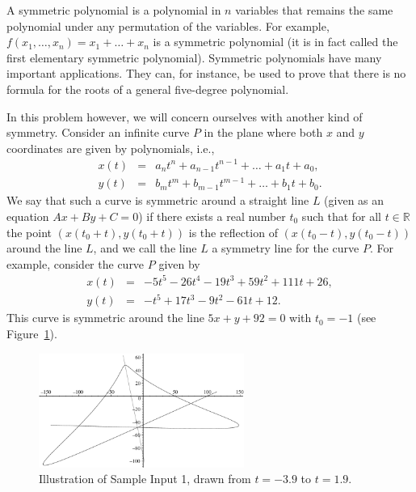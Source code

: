 
\noindent
A symmetric polynomial is a polynomial in $n$ variables that remains
the same polynomial under any permutation of the variables.  For
example, $f(x_1, \ldots, x_n) = x_1 + \ldots + x_n$ is a symmetric
polynomial (it is in fact called the first elementary symmetric
polynomial).  Symmetric polynomials have many important applications.
They can, for instance, be used to prove that there is no formula for
the roots of a general five-degree polynomial.

In this problem however, we will concern ourselves with another kind
of symmetry.  Consider an infinite curve $P$ in the plane where both
$x$ and $y$ coordinates are given by polynomials, i.e.,
\begin{eqnarray*}
  x(t) & = & a_nt^n + a_{n-1}t^{n-1} + \ldots + a_1t + a_0,\\
  y(t) & = & b_mt^m + b_{m-1}t^{m-1} + \ldots + b_1t + b_0.
\end{eqnarray*}
We say that such a curve is symmetric around a straight line $L$ (given
as an equation $Ax + By + C = 0$) if there exists a real number $t_0$ such
that for all $t \in \mathbb{R}$ the point $(x(t_0+t), y(t_0+t))$ is the reflection of $(x(t_0-t),
y(t_0-t))$ around the line $L$, and we call the line $L$ a symmetry
line for the curve $P$.  For example, consider the curve $P$ given by
\begin{eqnarray*}
  x(t) & = & -5t^5 - 26t^4 - 19t^3 + 59t^2 + 111t + 26, \\
  y(t) & = & -t^5 + 17t^3 - 9t^2 - 61t + 12.
\end{eqnarray*}
This curve is symmetric around the line $5x + y + 92 = 0$ with $t_0 = -1$ (see Figure~\ref{fig:sympoly sample}).

\begin{figure}[h]
    \centering
    \includegraphics[width=0.6\textwidth]{poly_example}
    \caption{Illustration of Sample Input 1, drawn from $t = -3.9$ to $t = 1.9$.}
    \label{fig:sympoly sample}
\end{figure}

